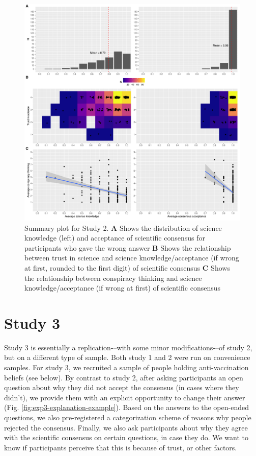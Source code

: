 \documentclass[
  doc,floatsintext]{apa6}
\begin{document}
\begin{figure}
\centering
\includegraphics{output/figures/exp2-plot-overview.pdf}
\caption{\label{fig:exp2-plot-overview}Summary plot for Study 2. \textbf{A} Shows the distribution of science knowledge (left) and acceptance of scientific consensus for participants who gave the wrong answer \textbf{B} Shows the relationship between trust in science and science knowledge/acceptance (if wrong at first, rounded to the first digit) of scientific consensus \textbf{C} Shows the relationship between conspiracy thinking and science knowledge/acceptance (if wrong at first) of scientific consensus}
\end{figure}

\clearpage

\section{Study 3}\label{exp3}

Study 3 is essentially a replication-\/--with some minor modifications-\/--of study 2, but on a different type of sample. Both study 1 and 2 were run on convenience samples. For study 3, we recruited a sample of people holding anti-vaccination beliefs (see below). By contrast to study 2, after asking participants an open question about why they did not accept the consensus (in cases where they didn't), we provide them with an explicit opportunity to change their answer (Fig. \ref{fig:exp3-explanation-example}). Based on the answers to the open-ended questions, we also pre-registered a categorization scheme of reasons why people rejected the consensus. Finally, we also ask participants about why they agree with the scientific consensus on certain questions, in case they do. We want to know if participants perceive that this is because of trust, or other factors.
\end{document}
